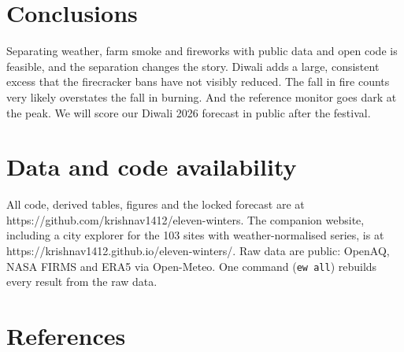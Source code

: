 \documentclass[
  11pt,
]{article}
\begin{document}
\section{Conclusions}\label{conclusions}

Separating weather, farm smoke and fireworks with public data and open
code is feasible, and the separation changes the story. Diwali adds a
large, consistent excess that the firecracker bans have not visibly
reduced. The fall in fire counts very likely overstates the fall in
burning. And the reference monitor goes dark at the peak. We will score
our Diwali 2026 forecast in public after the festival.

\section{Data and code availability}\label{data-and-code-availability}

All code, derived tables, figures and the locked forecast are at
https://github.com/krishnav1412/eleven-winters. The companion website,
including a city explorer for the 103 sites with weather-normalised
series, is at https://krishnav1412.github.io/eleven-winters/. Raw data
are public: OpenAQ, NASA FIRMS and ERA5 via Open-Meteo. One command
(\texttt{ew\ all}) rebuilds every result from the raw data.

\section*{References}\label{references}
\end{document}
